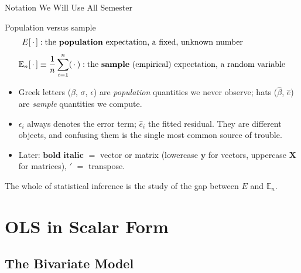 \documentclass[aspectratio=169,11pt,xcolor=dvipsnames]{beamer}
\newcommand{\E}{E}
\newcommand{\En}{\mathbb{E}_n}
\newcommand{\X}{\bm{X}}
\newcommand{\Y}{\bm{y}}
\begin{document}
\begin{frame}{Notation We Will Use All Semester}
\begin{block}{Population versus sample}
\begin{align*}
  \E[\,\cdot\,] &: \text{the \textbf{population} expectation, a fixed, unknown number} \\[3pt]
  \En[\,\cdot\,] &\equiv \frac{1}{n}\sum_{i=1}^{n} (\,\cdot\,)
  : \text{the \textbf{sample} (empirical) expectation, a random variable}
\end{align*}
\end{block}
\vskip2pt
\begin{itemize}\itemsep3pt
  \item Greek letters ($\beta$, $\sigma$, $\epsilon$) are \emph{population}
        quantities we never observe; hats ($\hat\beta$, $\hat e$) are \emph{sample}
        quantities we compute.
  \item $\epsilon_i$ always denotes the error term; $\hat e_i$ the fitted residual.
        They are different objects, and confusing them is the single most common
        source of trouble.
  \item Later: $\bm{\text{bold italic}}$ $=$ vector or matrix (lowercase
        $\Y$ for vectors, uppercase $\X$ for matrices), $'$ $=$ transpose.
\end{itemize}
\vskip2pt
The whole of statistical inference is the study of the gap between $\E$ and $\En$.
\end{frame}

\section[Scalar OLS]{OLS in Scalar Form}
\begin{frame}\sectionpage\end{frame}

\subsection*{The Bivariate Model}
\begin{frame}\subsectionpage\end{frame}
\end{document}
